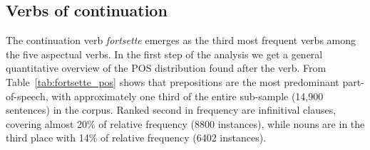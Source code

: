 \documentclass{article}
\begin{document}
 



\subsection{Verbs of continuation}


The continuation verb \emph{fortsette} emerges as the third most frequent verbs among the five aspectual verbs. In the first step of the analysis we get a general quantitative overview of the POS distribution found after the verb. From Table~\ref{tab:fortsette_pos} shows that prepositions are the most predominant part-of-speech, with approximately one third of the entire sub-sample (14,900 sentences) in the corpus. Ranked second in frequency are infinitival clauses, covering almost 20\% of relative frequency (8800 instances), while nouns are in the third place with 14\% of relative frequency (6402 instances). 

\vspace{1cm}
\end{document}

